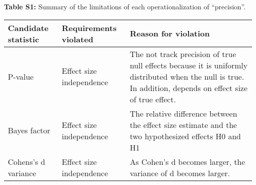 \documentclass[]{article}
\begin{document}
\textbf{Table S1:} Summary of the limitations of each operationalization
of ``precision''.

\begin{longtable}[]{@{}lll@{}}
\toprule
\begin{minipage}[b]{0.18\columnwidth}\raggedright
Candidate statistic\strut
\end{minipage} & \begin{minipage}[b]{0.10\columnwidth}\raggedright
Requirements violated\strut
\end{minipage} & \begin{minipage}[b]{0.63\columnwidth}\raggedright
Reason for violation\strut
\end{minipage}\tabularnewline
\midrule
\endhead
\begin{minipage}[t]{0.18\columnwidth}\raggedright
P-value\strut
\end{minipage} & \begin{minipage}[t]{0.10\columnwidth}\raggedright
Effect size independence\strut
\end{minipage} & \begin{minipage}[t]{0.63\columnwidth}\raggedright
The not track precision of true null effects because it is uniformly
distributed when the null is true. In addition, depends on effect size
of true effect.\strut
\end{minipage}\tabularnewline
\begin{minipage}[t]{0.18\columnwidth}\raggedright
Bayes factor\strut
\end{minipage} & \begin{minipage}[t]{0.10\columnwidth}\raggedright
Effect size independence\strut
\end{minipage} & \begin{minipage}[t]{0.63\columnwidth}\raggedright
The relative difference between the effect size estimate and the two
hypothesized effects H0 and H1\strut
\end{minipage}\tabularnewline
\begin{minipage}[t]{0.18\columnwidth}\raggedright
Cohens's d variance\strut
\end{minipage} & \begin{minipage}[t]{0.10\columnwidth}\raggedright
Effect size independence\strut
\end{minipage} & \begin{minipage}[t]{0.63\columnwidth}\raggedright
As Cohen's d becomes larger, the variance of d becomes larger.\strut
\end{minipage}\tabularnewline

\end{longtable}
\end{document}

